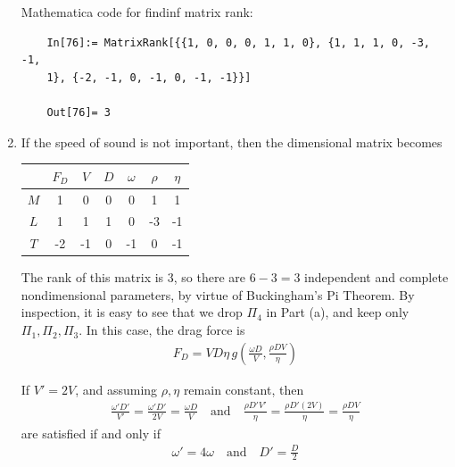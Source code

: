 \documentclass{article}
\theoremstyle{definition}
\newcommand{\f}[2]{\frac{#1}{#2}}
\newcommand{\lp}{\left(}
\newcommand{\rp}{\right)}
\begin{document}
\begin{enumerate}[label=(\alph*)]
	
	Mathematica code for findinf matrix rank:
	\begin{lstlisting}
	In[76]:= MatrixRank[{{1, 0, 0, 0, 1, 1, 0}, {1, 1, 1, 0, -3, -1, 
	1}, {-2, -1, 0, -1, 0, -1, -1}}]
	
	Out[76]= 3
	\end{lstlisting}
	
	\item If the speed of sound is not important, then the dimensional matrix becomes
	\begin{center}
		\begin{tabular}{c|c c c c  c c }
			& $F_D$ & $V$ & $D$ & $\omega$ & $\rho$ & $\eta$  \\
			\hline
			$M$ & 1     & 0   & 0   &  0       & 1      &  1      \\
			$L$ & 1     & 1   & 1   &  0       & -3     & -1       \\ 
			$T$ & -2    & -1  & 0   & -1       & 0      & -1    \\  
		\end{tabular} 
	\end{center}

	The rank of this matrix is 3, so there are $6-3 = 3$  independent and complete nondimensional parameters, by virtue of Buckingham's Pi Theorem. By inspection, it is easy to see that we drop $\Pi_4$ in Part (a), and keep only $\Pi_1, \Pi_2,\Pi_3$. In this case, the drag force is 
	\begin{align*}
	\boxed{ F_D = VD\eta\, g\lp \f{ \omega D}{V}, \f{ \rho DV}{\eta} \rp}
	\end{align*}
	
	If $V'=2V$, and assuming $\rho,\eta$ remain constant, then 
	\begin{align*}
	\f{\omega'D'}{V'} = \f{\omega' D'}{2V} = \f{\omega D}{V} \quad \text{and} \quad 
	\f{\rho D' V'}{\eta} = \f{\rho D' (2V) }{\eta} = \f{\rho DV}{\eta} 
	\end{align*}
	are satisfied if and only if 
	\begin{align*}
	\boxed{\omega' = 4\omega \quad\text{and}\quad D' = \f{D}{2}}
	\end{align*}
	
\end{enumerate}
\end{document}
